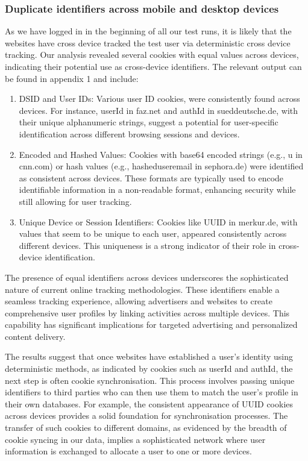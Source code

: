 \subsubsection{Duplicate identifiers across mobile and desktop devices}
As we have logged in in the beginning of all our test runs, it is likely that the websites have cross device tracked the test user via deterministic cross device tracking. Our analysis revealed several cookies with equal values across devices, indicating their potential use as cross-device identifiers. The relevant output can be found in appendix 1 and include:
\begin{enumerate}
    \item DSID and User IDs: Various user ID cookies, were consistently found across devices. For instance, userId in faz.net and authId in sueddeutsche.de, with their unique alphanumeric strings, suggest a potential for user-specific identification across different browsing sessions and devices.
    \item Encoded and Hashed Values: Cookies with base64 encoded strings (e.g., u in cnn.com) or hash values (e.g., hasheduseremail in sephora.de) were identified as consistent across devices. These formats are typically used to encode identifiable information in a non-readable format, enhancing security while still allowing for user tracking.
    \item Unique Device or Session Identifiers: Cookies like UUID in merkur.de, with values that seem to be unique to each user, appeared consistently across different devices. This uniqueness is a strong indicator of their role in cross-device identification.
\end{enumerate}
The presence of equal identifiers across devices underscores the sophisticated nature of current online tracking methodologies. These identifiers enable a seamless tracking experience, allowing advertisers and websites to create comprehensive user profiles by linking activities across multiple devices. This capability has significant implications for targeted advertising and personalized content delivery.

The results suggest that once websites have established a user's identity using deterministic methods, as indicated by cookies such as userId and authId, the next step is often cookie synchronisation. This process involves passing unique identifiers to third parties who can then use them to match the user's profile in their own databases. For example, the consistent appearance of UUID cookies across devices provides a solid foundation for synchronisation processes. The transfer of such cookies to different domains, as evidenced by the breadth of cookie syncing in our data, implies a sophisticated network where user information is exchanged to allocate a user to one or more devices.

